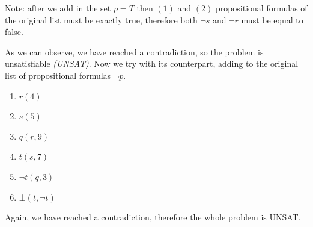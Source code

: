 \begin{example}
    Note: after we add in the set $p = T$ then $(1)$ and $(2)$ propositional formulas of the original list must be exactly true, therefore both $\neg s$ and 
    $\neg r$ must be equal to false. \vspace{7pt}

    As we can observe, we have reached a contradiction, so the problem is unsatisfiable \textit{(UNSAT)}. Now we try with its counterpart, adding to 
    the original list of propositional formulas $\neg p$.
    \begin{enumerate}
        \item $r(4)$
        \item $s(5)$
        \item $q(r, 9)$
        \item $t(s, 7)$
        \item $\neg t(q, 3)$
        \item $\bot (t, \neg t)$
    \end{enumerate} \vspace{7pt}

    Again, we have reached a contradiction, therefore the whole problem is UNSAT.
\end{example}